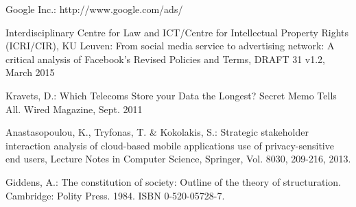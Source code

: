 \documentclass{llncs}
\begin{document}
\begin{thebibliography}{}
Google Inc.:
http://www.google.com/ads/

Interdisciplinary Centre for Law and ICT/Centre for Intellectual Property Rights (ICRI/CIR), KU Leuven:
From social media service to advertising network: A critical analysis of Facebook’s Revised Policies and Terms, DRAFT 31 v1.2, March 2015

Kravets, D.:
Which Telecoms Store your Data the Longest? Secret Memo Tells All. Wired Magazine, Sept. 2011

Anastasopoulou, K., Tryfonas, T. \& Kokolakis, S.:
Strategic stakeholder interaction analysis of cloud-based mobile applications use of privacy-sensitive end users, Lecture Notes in Computer Science, Springer, Vol. 8030, 209-216, 2013.

Giddens, A.:
The constitution of society: Outline of the theory of structuration. Cambridge: Polity Press. 1984. ISBN 0-520-05728-7.

\end{thebibliography}
\end{document}
